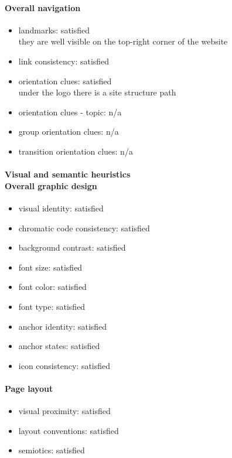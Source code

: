 \begin{enumerate}
	\paragraph*{Overall navigation}
	\begin{itemize}
		\item landmarks: satisfied\\
		they are well visible on the top-right corner of the website
		\item link consistency: satisfied
		\item orientation clues: satisfied\\
		under the logo there is a site structure path
		\item orientation clues - topic: n/a
		\item group orientation clues: n/a
		\item transition orientation clues: n/a
	\end{itemize}	
	
	\paragraph*{Visual and semantic heuristics \\ Overall graphic design }
	\begin{itemize}
		\item visual identity: satisfied
		\item chromatic code consistency: satisfied
		\item background contrast: satisfied
		\item font size: satisfied
		\item font color: satisfied
		\item font type: satisfied
		\item anchor identity: satisfied
		\item anchor states: satisfied
		\item icon consistency: satisfied
	\end{itemize}
	
	\paragraph*{Page layout}
	\begin{itemize}
		\item visual proximity: satisfied
		\item layout conventions: satisfied
		\item semiotics: satisfied
	\end{itemize}	
	

\end{enumerate}
